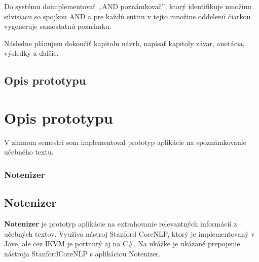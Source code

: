 Do systému doimplementovať ,,AND poznámkovač'', ktorý identifikuje množinu súvisiacu so spojkou AND a pre každú entitu v tejto množine oddelenú čiarkou vygeneruje samostatnú poznámku.

Následne plánujem dokončiť kapitolu návrh, napísať kapitoly závar, anotácia, výsledky a ďalšie.
%
%
{
	\section{Opis prototypu} 
}
{
	\chapter{Opis prototypu}
}
V zimnom semestri som implementoval prototyp aplikácie na spoznámkovanie učebného textu.

%
%
{
	\subsection{Notenizer} 
}
{
	\section{Notenizer}
}
\label{subsection:notenizer}
\textbf{Notenizer} je prototyp aplikácie na extrahovanie relevantných informácií z učebných textov. Využíva nástroj Stanford CoreNLP, ktorý je implementovaný v Jave, ale cez IKVM je portnutý aj na C\#. Na ukážke  je ukázané prepojenie nástroja StanfordCoreNLP s aplikáciou Notenizer. 
\\

